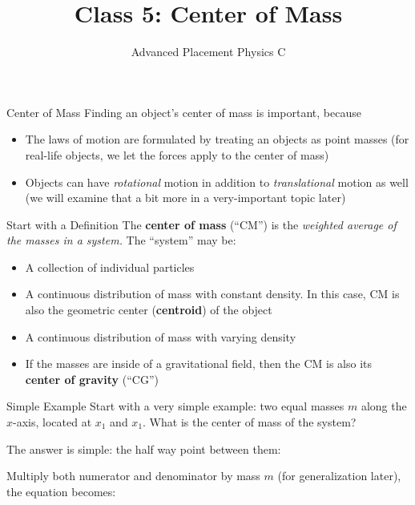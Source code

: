 \documentclass[12pt,compress,aspectratio=169]{beamer}
\title{Class 5: Center of Mass}
\subtitle{Advanced Placement Physics C}
\begin{document}
\begin{frame}
  \maketitle
\end{frame}



\begin{frame}{Center of Mass}
  Finding an object's center of mass is important, because
  \begin{itemize}
  \item The laws of motion are formulated by treating an objects as point
    masses (for real-life objects, we let the forces apply to the center of
    mass)
  \item Objects can have \emph{rotational} motion in addition to
    \emph{translational} motion as well (we will examine that a bit more in a
    very-important topic later)
  \end{itemize}
\end{frame}



\begin{frame}{Start with a Definition}
  The \textbf{center of mass} (``CM'') is the \emph{weighted average of the
    masses in a system.} The ``system'' may be:
  \begin{itemize}
  \item A collection of individual particles
  \item A continuous distribution of mass with constant density. In this case,
    CM is also the geometric center (\textbf{centroid}) of the object
  \item A continuous distribution of mass with varying density
  \item If the masses are inside of a gravitational field, then the CM is also
    its \textbf{center of gravity} (``CG'')
  \end{itemize}
\end{frame}



\begin{frame}{Simple Example}
  Start with a very simple example: two equal masses $m$ along the $x$-axis,
  located at $x_1$ and $x_1$. What is the center of mass of the system?
  \begin{center}
  \end{center}
  The answer is simple: the half way point between them:


  Multiply both numerator and denominator by mass $m$ (for generalization
  later), the equation becomes:

\end{frame}
\end{document}
